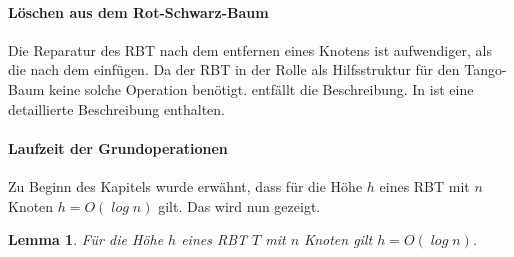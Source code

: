 \documentclass[a4paper,12pt]{article}
\begin{document}
\paragraph{Löschen aus dem Rot-Schwarz-Baum}
Die Reparatur des RBT nach dem entfernen eines Knotens ist aufwendiger, als die nach dem einfügen. Da der RBT in der Rolle als Hilfsstruktur für den Tango-Baum keine solche Operation benötigt. entfällt die Beschreibung. In \cite{algEinf} ist eine detaillierte Beschreibung enthalten. 
\paragraph{Laufzeit der Grundoperationen}
Zu Beginn des Kapitels wurde erwähnt, dass für die Höhe $h$ eines RBT mit $n$ Knoten $h = \mathit{O(\log {n})}$  gilt. Das wird nun gezeigt. 
\newtheorem{Lemma2}{Lemma}[section]
\begin{Lemma2} Für die Höhe $h$ eines RBT $T$ mit $n$ Knoten gilt $h = \mathit{O(\log {n})}$.
\end{Lemma2}
\end{document}
